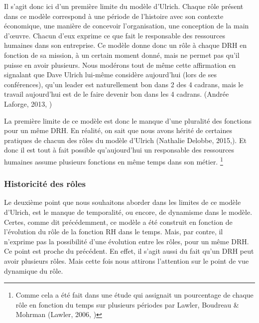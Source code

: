 Il s'agit donc ici d'un première limite du modèle d'Ulrich. Chaque rôle présent dans ce modèle correspond à une période de l'histoire avec son contexte économique, une manière de concevoir l'organisation, une conception de la main d'\oe{}uvre. Chacun d'eux exprime ce que fait le responsable des ressources humaines dans son entreprise. Ce modèle donne donc un rôle à chaque DRH en fonction de sa mission, à un certain moment donné, mais ne permet pas qu'il puisse en avoir plusieurs. Nous modérons tout de même cette affirmation en signalant que Dave Ulrich lui-même considère aujourd'hui (lors de ses conférences), qu'un leader est naturellement bon dans 2 des 4 cadrans, mais le travail aujourd'hui est de le faire devenir bon dans les 4 cadrans. (Andrée Laforge, 2013, \cite{capitalhumain})\newline 


La première limite de ce modèle est donc le manque d'une pluralité des fonctions pour un même DRH. En réalité, on sait que nous avons hérité de certaines pratiques de chacun des rôles du modèle d'Ulrich (Nathalie Delobbe, 2015,\cite{slidegrh}). Et donc il est tout à fait possible qu'aujourd'hui un responsable des ressources humaines assume plusieurs fonctions en même temps dans son métier.
\footnote{Comme cela a été fait dans une étude qui assignait un pourcentage de chaque rôle en fonction du temps sur plusieurs périodes par Lawler, Boudreau \& Mohrman (Lawler, 2006, \cite{Lawler2006})}\\



\subsubsection*{Historicité des rôles}

Le deuxième point que nous souhaitons aborder dans les limites de ce modèle d'Ulrich, est le manque de temporalité, ou encore, de dynamisme dans le modèle. Certes, comme dit précédemment, ce modèle a été construit en fonction de l'évolution du rôle de la fonction RH dans le temps. Mais, par contre, il n'exprime pas la possibilité d'une évolution entre les rôles, pour un même DRH. Ce point est proche du précédent. En effet, il s'agit aussi du fait qu'un DRH peut avoir plusieurs rôles. Mais cette fois nous attirons l'attention sur le point de vue dynamique du rôle. \\


